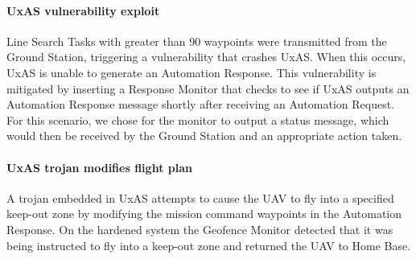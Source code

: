 \paragraph{UxAS vulnerability exploit} Line Search Tasks with greater than 90 waypoints were transmitted from the Ground Station, triggering a vulnerability that crashes UxAS.   When this occurs, UxAS is unable to generate an Automation Response.
This vulnerability is mitigated by inserting a Response Monitor that checks to see if UxAS outputs an Automation Response message shortly after receiving an Automation Request.  For this scenario, we chose for the monitor to output a status message, which would then be received by the Ground Station and an appropriate action taken.

\paragraph{UxAS trojan modifies flight plan} A trojan embedded in UxAS attempts to cause the UAV to fly into a specified keep-out zone by modifying the mission command waypoints in the Automation Response.
On the hardened system the Geofence Monitor detected that it was being instructed to fly into a keep-out zone and returned the UAV to Home Base.


